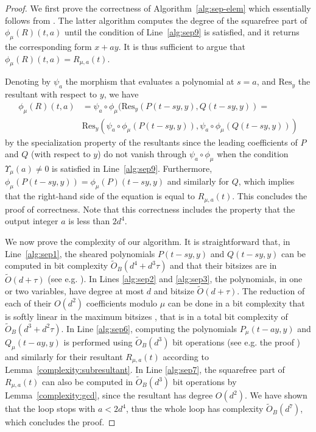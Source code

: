 \documentclass{sig-alternate}
\newcommand{\sO}{\ensuremath{\widetilde{{O}}}}
\newcommand{\sOB}{\ensuremath{\widetilde{{O}}_B}}
\newcommand{\blue}[1]{\color{blue}#1\color{black}\xspace}
\renewcommand{\blue}[1]{#1\xspace}
\begin{document}
\begin{proof}
We first prove the correctness of Algorithm~\ref{alg:sep-elem}  which essentially follows from 
\blue{\cite[Algorithm~4]{bouzidiJSC2014a}}. The latter algorithm computes the degree of the
squarefree part of $\phi_\mu(R)(t,a)$ until the condition of Line~\ref{alg:sep9} is satisfied, and
it returns the corresponding form $x+ay$.
It is thus sufficient to argue that $\phi_\mu(R)(t,a)=R_{\mu,a}(t)$. 

Denoting by $\psi_a$ the morphism that evaluates a polynomial at $s=a$, and $\text{Res}_y$ the
resultant with respect to $y$, we have 
\[\begin{split}
\phi_\mu(R)(t,a)&=\psi_a\circ\phi_\mu(\text{Res}_y(P(t-sy,y),Q(t-sy,y)) =\\
&\text{Res}_y(\psi_a\circ\phi_\mu(P(t-sy,y)), \psi_a\circ\phi_\mu(Q(t-sy,y)))
\end{split}\]
by the specialization property of the resultants 
since the leading coefficients of $P$ and $Q$ (with respect to $y$) do not vanish through
$\psi_a\circ\phi_\mu$ when the condition $\Upsilon_\mu(a)\neq 0$ is
satisfied in  Line~\ref{alg:sep9}. Furthermore, $\phi_\mu(P(t-sy,y))=\phi_\mu(P)(t-sy,y)$ and similarly for $Q$, which
implies that the right-hand side  of the equation is equal to $R_{\mu,a}(t)$. This concludes the proof
of correctness. Note that this correctness includes the property that the output
integer $a$ is less than $2d^4$.




We now prove the complexity of our algorithm. 
It is
straightforward that,  in Line~\ref{alg:sep1}, the sheared polynomials $P(t-sy,y)$ and
$Q(t-sy,y)$ can be computed  in bit complexity
$\sOB(d^4+d^3\tau)$ and that their bitsizes are in $\sO(d+\tau)$ (see e.g. \blue{\cite[Lemma 7]{bouzidiJSC2014a}}). In Lines \ref{alg:sep2} and \ref{alg:sep3}, the polynomials, in one or two variables, have degree at most $d$ and bitsize $\sO(d+\tau)$. The reduction of each of their $O(d^2)$ coefficients modulo $\mu$ can be done in a bit complexity that is softly linear in the
 maximum bitsizes \cite[Thm. 9.8]{vzGGer2}, that is  in a total bit complexity of $\sOB(d^3+d^2\tau)$. 
In Line  \ref{alg:sep6}, computing the polynomials $P_\mu(t-ay,y)$ and $Q_\mu(t-ay,y)$ is performed using
$\sOB(d^3)$ bit operations (see e.g. the proof \blue{\cite[Lemma 7]{bouzidiJSC2014a}}) and similarly for their resultant $R_{\mu,a}(t)$ according to
Lemma~\ref{complexity:subresultant}. 
In Line  \ref{alg:sep7}, the squarefree part of $R_{\mu,a}(t)$ can also be computed in $\sOB(d^3)$
bit operations by Lemma~\ref{complexity:gcd}, since the resultant has degree $O(d^2)$.
We have shown that the loop stops with $a<2d^4$, thus the whole  loop has complexity
$\sOB(d^7)$, which concludes the proof.
\end{proof}
\end{document}
